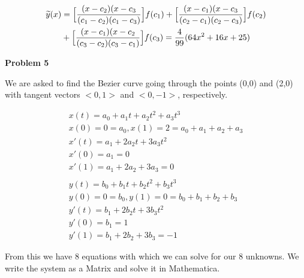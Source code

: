 \documentclass[a4paper,12pt]{article}
\begin{document}
\begin{equation*}
\begin{split}
\widetilde{y}(x) &=\Big{[} \frac{(x-c_2)(x-c_3}{(c_1-c_2)(c_1-c_3)} \Big{]}f(c_1)+\Big{[} \frac{(x-c_1)(x-c_3}{(c_2-c_1)(c_2-c_3)} \Big{]}f(c_2) \\ 
 &+\Big{[} \frac{(x-c_1)(x-c_2}{(c_3-c_2)(c_3-c_1)} \Big{]}f(c_3) = \frac{4}{99}(64x^2+16x+25)
\end{split}
\end{equation*}

{\bf Problem  5}
\smallskip

We are asked to find the Bezier curve going through the points (0,0) and (2,0) with tangent vectors $<0,1>$ and $<0,-1>$, respectively. 

\begin{eqnarray*}
x(t)=a_0+a_1t+a_2t^2+a_3t^3 \\
x(0)=0=a_0, x(1)=2=a_0+a_1+a_2+a_3 \\
x'(t)=a_1+2a_2t+3a_3t^2 \\
x'(0)=a_1=0 \\
x'(1)=a_1+2a_2+3a_3=0 \\
\\
y(t)=b_0+b_1t+b_2t^2+b_3t^3 \\
y(0)=0=b_0, y(1)=0=b_0+b_1+b_2+b_3 \\
y'(t)=b_1+2b_2t+3b_3t^2 \\
y'(0)=b_1=1 \\
y'(1)=b_1+2b_2+3b_3=-1
\end{eqnarray*}

From this we have 8 equations with which we can solve for our 8 unknowns. We write the system as a Matrix and solve it in Mathematica. 
\end{document}
